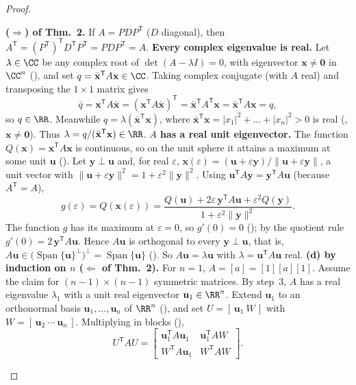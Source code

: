 \documentclass[10pt]{scrartcl}
\newcommand{\vv}[1]{\mathbf{#1}}
\DeclareMathOperator{\spn}{Span}
\begin{document}
\begin{proof}
  \begin{steps}
    \ii \textbf{($\Rightarrow$) of Thm.~2.} If $A=PDP^{\mathsf T}$ ($D$ diagonal), then $A^{\mathsf T}=(P^{\mathsf T})^{\mathsf T}D^{\mathsf T}P^{\mathsf T}=PDP^{\mathsf T}=A$.
    \ii \textbf{Every complex eigenvalue is real.} Let $\lambda\in\CC$ be any complex root of $\det(A-\lambda I)=0$, with eigenvector $\vv x\ne\vv 0$ in $\CC^n$ (), and set $q=\bar{\vv x}^{\mathsf T}A\vv x\in\CC$. Taking complex conjugate (with $A$ real) and transposing the $1\times 1$ matrix gives
    \[
      \bar q = \vv x^{\mathsf T}A\bar{\vv x} = (\vv x^{\mathsf T}A\bar{\vv x})^{\mathsf T} = \bar{\vv x}^{\mathsf T}A^{\mathsf T}\vv x = \bar{\vv x}^{\mathsf T}A\vv x = q,
    \]
    so $q\in\RR$. Meanwhile $q=\lambda(\bar{\vv x}^{\mathsf T}\vv x)$, where $\bar{\vv x}^{\mathsf T}\vv x=|x_1|^2+\dots+|x_n|^2>0$ is real (, $\vv x\ne\vv 0$).  Thus $\lambda=q/(\bar{\vv x}^{\mathsf T}\vv x)\in\RR$.
    \ii \textbf{$A$ has a real unit eigenvector.} The function $Q(\vv x)=\vv x^{\mathsf T}A\vv x$ is continuous, so on the unit sphere it attains a maximum at some unit $\vv u$ (). Let $\vv y\perp\vv u$ and, for real $\varepsilon$, $\vv x(\varepsilon)=(\vv u+\varepsilon\vv y)/\|\vv u+\varepsilon\vv y\|$, a unit vector with $\|\vv u+\varepsilon\vv y\|^2=1+\varepsilon^2\|\vv y\|^2$. Using $\vv u^{\mathsf T}A\vv y=\vv y^{\mathsf T}A\vv u$ (because $A^{\mathsf T}=A$),
    \[
      g(\varepsilon)=Q(\vv x(\varepsilon))=\frac{Q(\vv u)+2\varepsilon\,\vv y^{\mathsf T}A\vv u+\varepsilon^2Q(\vv y)}{1+\varepsilon^2\|\vv y\|^2}.
    \]
    The function $g$ has its maximum at $\varepsilon=0$, so $g'(0)=0$ (); by the quotient rule $g'(0)=2\,\vv y^{\mathsf T}A\vv u$. Hence $A\vv u$ is orthogonal to every $\vv y\perp\vv u$, that is, $A\vv u\in\bigl(\spn\{\vv u\}^\perp\bigr)^\perp=\spn\{\vv u\}$ (). So $A\vv u=\lambda\vv u$ with $\lambda=\vv u^{\mathsf T}A\vv u$ real.
    \ii \textbf{(d) by induction on $n$ ($\Leftarrow$ of Thm.~2).} For $n=1$, $A=[a]=[1][a][1]$. Assume the claim for $(n-1)\times(n-1)$ symmetric matrices. By step~3, $A$ has a real eigenvalue $\lambda_1$ with a unit real eigenvector $\vv u_1\in\RR^n$. Extend $\vv u_1$ to an orthonormal basis $\vv u_1,\dots,\vv u_n$ of $\RR^n$ (), and set $U=[\,\vv u_1\ W\,]$ with $W=[\,\vv u_2\ \cdots\ \vv u_n\,]$.
    \ii Multiplying in blocks (),
    \[
      U^{\mathsf T}AU = \begin{bmatrix}\vv u_1^{\mathsf T}A\vv u_1 & \vv u_1^{\mathsf T}AW\\ W^{\mathsf T}A\vv u_1 & W^{\mathsf T}AW\end{bmatrix}.
\]
\end{steps}
\end{proof}
\end{document}
